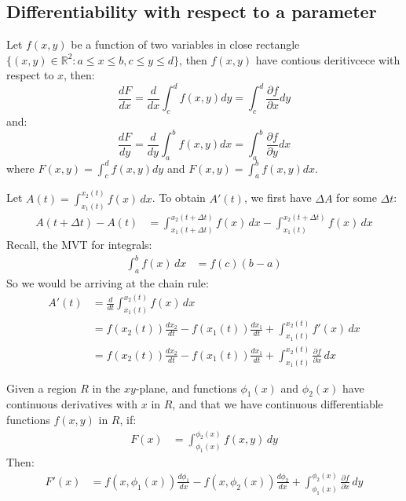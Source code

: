 \documentclass[11pt]{article}
\begin{document}
\subsection{Differentiability with respect to a parameter}
\begin{theorem}
    Let $f(x, y)$ be a function of two variables in close rectangle $\{(x,y) \in \mathbb{R}^2: a \leq x \leq b, c \leq y \leq d\}$, then $f(x, y)$ have contious deritivcece with respect to $x$, then:
    $$ \frac{dF}{dx} = \frac{d}{dx}\int^d_c f(x, y) dy = \int^d_c \frac{\partial f}{\partial x} dy$$
    and:
    $$ \frac{dF}{dy} = \frac{d}{dy}\int^b_a f(x, y) dx = \int^b_a \frac{\partial f}{\partial y} dx$$
    where $F(x,y) = \int^d_c f(x, y) dy$ and $F(x,y) = \int^b_a f(x, y) dx$.
\end{theorem}
\begin{example}
    Let $A(t) = \int_{x_1(t)}^{x_2(t)} f(x) \, dx$. To obtain $A'(t)$, we first have $\Delta A$ for some $\Delta t$:
    \begin{align*}
        A(t + \Delta t) - A(t) &= \int_{x_1(t + \Delta t)}^{x_2(t + \Delta t)} f(x) \, dx - \int_{x_1(t)}^{x_2(t + \Delta t)} f(x) \, dx
    \end{align*}
    Recall, the MVT for integrals:
    \begin{align*}
        \int_a^b f(x) \, dx &= f(c)(b - a)
    \end{align*}
    So we would be arriving at the chain rule:
    \begin{align*}
        A'(t) &= \frac{d}{dt} \int_{x_1(t)}^{x_2(t)} f(x) \, dx \\
        &= f(x_2(t)) \frac{d x_2}{dt} - f(x_1(t)) \frac{d x_1}{dt} + \int_{x_1(t)}^{x_2(t)} f'(x) \, dx \\
        &= f(x_2(t)) \frac{d x_2}{dt} - f(x_1(t)) \frac{d x_1}{dt} + \int_{x_1(t)}^{x_2(t)} \frac{\partial f}{\partial x} \, dx
    \end{align*}
\end{example}
\begin{theorem}
    Given a region $R$ in the $xy$-plane, and functions $\phi_1(x)$ and $\phi_2(x)$ have continuous derivatives with $x$ in $R$, and that we have continuous differentiable functions $f(x, y)$ in $R$, if:
    \begin{align*}
       F(x) &= \int_{\phi_1(x)}^{\phi_2(x)} f(x, y) \, dy
    \end{align*}
    Then:
    \begin{align*}
        F'(x) &= f(x, \phi_1(x)) \frac{d \phi_1}{dx} - f(x, \phi_2(x)) \frac{d \phi_2}{dx} + \int_{\phi_1(x)}^{\phi_2(x)} \frac{\partial f}{\partial x} \, dy
    \end{align*}
\end{theorem}
\end{document}
